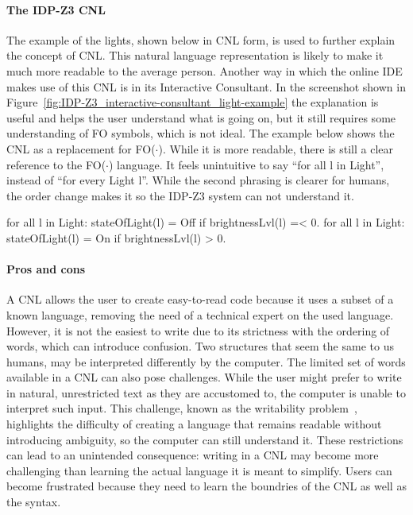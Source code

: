 \documentclass[11pt,a4paper]{report}
\newcommand{\fodot}{FO($\cdot$)\xspace}
\begin{document}
\paragraph{The IDP-Z3 CNL}
The example of the lights, shown below in CNL form, is used to further explain the concept of CNL. This natural language representation is likely to make it much more readable to the average person. Another way in which the online IDE makes use of this CNL is in its Interactive Consultant. In the screenshot shown in Figure~\ref{fig:IDP-Z3_interactive-consultant_light-example} the explanation is useful and helps the user understand what is going on, but it still requires some understanding of FO symbols, which is not ideal.
The example below shows the CNL as a replacement for \fodot. While it is more readable, there is still a clear reference to the \fodot language. It feels unintuitive to say ``for all l in Light'', instead of ``for every Light l''. While the second phrasing is clearer for humans, the order change makes it so the IDP-Z3 system can not understand it.

\begin{idplisting}
{
for all l in Light: stateOfLight(l) = Off if brightnessLvl(l) =< 0.
for all l in Light: stateOfLight(l) = On if brightnessLvl(l) > 0.
}
\end{idplisting}

\paragraph{Pros and cons}
A CNL allows the user to create easy-to-read code because it uses a subset of a known language, removing the need of a technical expert on the used language. However, it is not the easiest to write due to its strictness with the ordering of words, which can introduce confusion. Two structures that seem the same to us humans, may be interpreted differently by the computer. The limited set of words available in a CNL can also pose challenges. While the user might prefer to write in natural, unrestricted text as they are accustomed to, the computer is unable to interpret such input. This challenge, known as the writability problem~\cite{CNL}, highlights the difficulty of creating a language that remains readable without introducing ambiguity, so the computer can still understand it.
These restrictions can lead to an unintended consequence: writing in a CNL may become more challenging than learning the actual language it is meant to simplify. Users can become frustrated because they need to learn the boundries of the CNL as well as the syntax.
\end{document}
